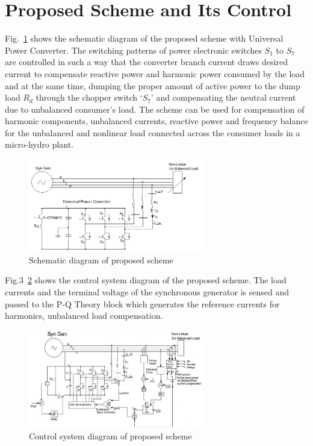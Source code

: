 \documentclass[journal,twoside]{IEEEtran}
\begin{document}
	\section{Proposed Scheme and Its Control}
Fig.~\ref{f2} shows the schematic diagram of the proposed scheme
with Universal Power Converter. The switching patterns of
power electronic switches $S_1$ to $S_7$ are controlled in such a way
that the converter branch current draws desired current to
compensate reactive power and harmonic power consumed by
the load and at the same time, dumping the proper amount of active power to the dump load $R_d $ through the chopper switch
$‘S_7 ’$ and compensating the neutral current due to unbalanced
consumer’s load. The scheme can be used for compensation of harmonic
components, unbalanced currents, reactive power and
frequency balance for the unbalanced and nonlinear load
connected across the consumer loads in a micro-hydro plant.
\begin{figure}[!ht]
\centering
\includegraphics[width=3in]{2}
\caption{Schematic diagram of proposed scheme}
\label{f2}
\end{figure}

\bigskip
Fig.3~\ref{f3} shows the control system diagram of the proposed
scheme. The load currents and the terminal voltage of the
synchronous generator is sensed and passed to the P-Q Theory
block which generates the reference currents for harmonics,
unbalanced load compensation.
\begin{figure}[!ht]
\centering
\includegraphics[width=3in]{3}
\caption{Control system diagram of proposed scheme}
\label{f3}
\end{figure}
\end{document}
